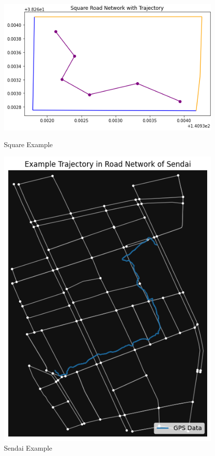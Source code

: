 \documentclass{article}
\numberwithin{equation}{section}
\theoremstyle{definition}
\begin{document}
\begin{figure}[h!]
\begin{minipage}[c]{0.4\linewidth}
\includegraphics[width=1.2\linewidth]{square.png}
\caption{Square Example}
\label{square}
\end{minipage}
\hfill
\begin{minipage}[c]{0.4\linewidth}
    \includegraphics[scale=.43]{trajectoryandroads.png}
    \caption{Sendai Example}
    \label{sendai}
\end{minipage}%
\end{figure}
\end{document}
